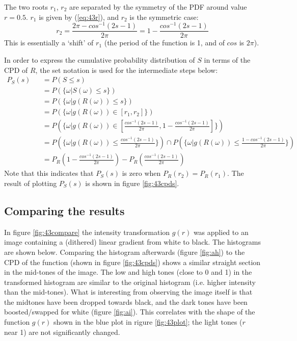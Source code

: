 \documentclass[a4paper]{article}
\begin{document}
The two roots $r_1$, $r_2$ are separated by the symmetry of the PDF around value $r=0.5$.
$r_1$ is given by (\ref{eq:43r}), and $r_2$ is the symmetric case:
\[
r_2 = \frac{2\pi - cos^{-1}(2s - 1)}{2\pi} = 1 - \frac{cos^{-1}(2s - 1)}{2\pi}
\]
This is essentially a `shift' of $r_1$ (the period of the function is 1, and of $cos$ is $2\pi$).

In order to express the cumulative probability distribution of $S$ in terms of the CPD of $R$, the set notation is used for the intermediate steps below:
\begin{eqnarray}
    P_S(s) && =  P(S \leq s)\\
           && =  P(\{\omega | S(\omega) \leq s\})\\
           && =  P(\{\omega | g(R(\omega)) \leq s\})\\ 
           && =  P(\{\omega | g(R(\omega)) \in [r_1,r_2]\})\\ 
           && =  P(\{\omega | g(R(\omega)) \in [\frac{cos^{-1}(2s - 1)}{2\pi},1 - \frac{cos^{-1}(2s - 1)}{2\pi}]\})\\   
           && =  P(\{\omega | g(R(\omega)) \leq \frac{cos^{-1}(2s - 1)}{2\pi}\}) \cap P(\{\omega | g(R(\omega)) \leq \frac{1-cos^{-1}(2s - 1)}{2\pi}\})\\
           && = P_R(1-\frac{cos^{-1}(2s - 1)}{2\pi}) - P_R(\frac{cos^{-1}(2s - 1)}{2\pi})
           \label{eq:43cpd1}
\end{eqnarray}
Note that this indicates that $P_S(s)$ is zero when $P_R(r_2)=P_R(r_1)$.
The result of plotting $P_S(s)$ is shown in figure \ref{fig:43cpds}.


\subsection*{Comparing the results}
In figure \ref{fig:43compare} the intensity transformation $g(r)$ was applied to an image containing a (dithered) linear gradient from white to black. The histograms are shown below. Comparing the histogram afterwards (figure \ref{fig:ah}) to the CPD of the function (shown in figure \ref{fig:43cpds}) shows a similar straight section in the mid-tones of the image. The low and high tones (close to 0 and 1) in the transformed histogram are similar to the original histogram (i.e. higher intensity than the mid-tones). What is interesting from observing the image itself is that the midtones have been dropped towards black, and the dark tones have been boosted/swapped for white (figure \ref{fig:ai}). This correlates with the shape of the function $g(r)$ shown in the blue plot in rigure \ref{fig:43plot}; the light tones ($r$ near 1) are not significantly changed.
\end{document}
